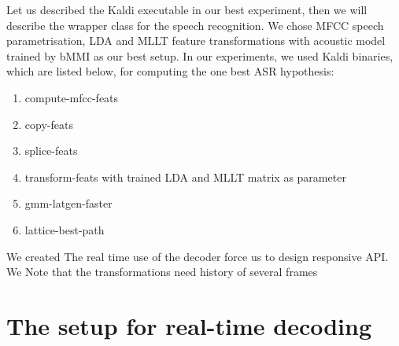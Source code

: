 Let us described the Kaldi executable in our best experiment,
then we will describe the wrapper class for the speech recognition.
We chose \ac{MFCC} speech parametrisation, \ac{LDA} and \ac{MLLT} feature transformations with 
acoustic model trained by \ac{bMMI} as our best setup.
In our experiments, we used Kaldi binaries, which are listed below, 
for computing the one best \ac{ASR} hypothesis:
\begin{enumerate}
    \item compute-mfcc-feats
    \item copy-feats
    \item splice-feats
    \item transform-feats with trained \ac{LDA} and \ac{MLLT} matrix as parameter
    \item \label{enum:latgen} gmm-latgen-faster
    \item lattice-best-path
\end{enumerate}


We created 
The real time use of the decoder force us to design responsive \acl{API}.
We  
Note that the transformations need history of several frames



\section{The setup for real-time decoding}






